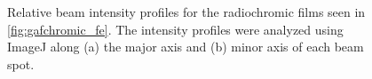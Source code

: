 \begin{figure}
    \centering
    \caption{Relative beam intensity profiles for the radiochromic films seen in \autoref{fig:gafchromic_fe}. The intensity profiles were analyzed using ImageJ along (a) the major axis and (b) minor axis of each beam spot. }
     \label{fig:gafchromic_fe_profiles}
\end{figure}



